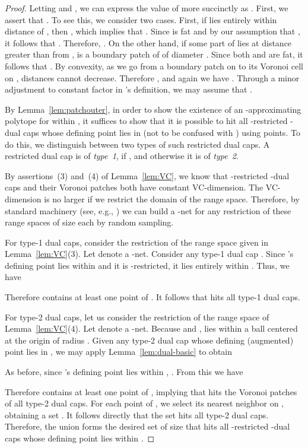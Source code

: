 \documentclass[11pt]{article}   \usepackage[letterpaper,hmargin=2.1cm,vmargin=3cm]{geometry}
\begin{document}
\begin{proof}
Letting  and , we can express the value of  more succinctly as . First, we assert that . To see this, we consider two cases. First, if  lies entirely within distance  of , then , which implies that . Since  is fat and by our assumption that , it follows that . Therefore, . On the other hand, if some part of  lies at distance greater than  from ,  is a boundary patch of  of diameter . Since both  and  are fat, it follows that . By convexity, as we go from a boundary patch on  to its Voronoi cell on , distances cannot decrease. Therefore , and again we have . Through a minor adjustment to constant factor  in 's definition, we may assume that .

By Lemma~\ref{lem:patchouter}, in order to show the existence of an -approximating polytope  for  within , it suffices to show that it is possible to hit all -restricted -dual caps whose defining point lies in  (not to be confused with ) using  points. To do this, we distinguish between two types of such restricted dual caps. A restricted dual cap  is of \emph{type~1}, if , and otherwise it is of \emph{type~2}.

By assertions~(3) and~(4) of Lemma~\ref{lem:VC}, we know that -restricted -dual caps and their Voronoi patches both have constant VC-dimension. The VC-dimension is no larger if we restrict the domain of the range space. Therefore, by standard machinery (see, e.g., \cite{probabilistic}) we can build a -net for any restriction of these range spaces of size  each by random sampling. 

For type-1 dual caps, consider the restriction  of the range space given in Lemma~\ref{lem:VC}(3). Let  denote a -net. Consider any type-1 dual cap . Since 's defining point lies within  and it is -restricted, it lies entirely within . Thus, we have

Therefore  contains at least one point of . It follows that  hits all type-1 dual caps.

For type-2 dual caps, let us consider the restriction  of the range space of Lemma~\ref{lem:VC}(4). Let  denote a -net. Because  and ,  lies within a ball centered at the origin of radius . Given any type-2 dual cap  whose defining (augmented) point lies in , we may apply Lemma~\ref{lem:dual-basic} to obtain

As before, since 's defining point lies within , . From this we have

Therefore  contains at least one point of , implying that  hits the Voronoi patches of all type-2 dual caps. For each point of , we select its nearest neighbor on , obtaining a set . It follows directly that the set  hits all type-2 dual caps. Therefore, the union  forms the desired set of size  that hits all -restricted -dual caps whose defining point lies within .
\end{proof}
\end{document}
